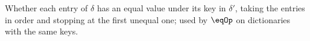 Whether each entry of $\delta$ has an equal value under its key in $\delta'$, taking the entries in
order and stopping at the first unequal one; used by $\eqOp$ on dictionaries with the same keys.
